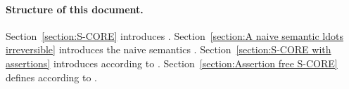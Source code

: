 \paragraph{Structure of this document.}
Section~\ref{section:S-CORE} introduces \SCORE.
Section~\ref{section:A naive semantic ldots irreversible} introduces the naive semantics \nsemantics.
Section~\ref{section:S-CORE with assertions} introduces \asemantics according to \PIF.
Section~\ref{section:Assertion free S-CORE} defines \rsemantics according to \TIF.